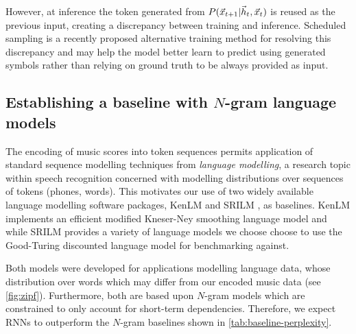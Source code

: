 However, at inference the token generated from $P(\vec{x}_{t+1} | \vec{h}_t, \vec{x}_t)$ is
reused as the previous input, creating a discrepancy between training and
inference. Scheduled sampling \citep{bengio2015scheduled} is a recently
proposed alternative training method for resolving this discrepancy and may
help the model better learn to predict using generated symbols rather than
relying on ground truth to be always provided as input.

\subsection{Establishing a baseline with $N$-gram language models}\label{sec:ngram-baselines}

The encoding of music scores into token sequences permits application of
standard sequence modelling techniques from \emph{language modelling}, a
research topic within speech recognition concerned with modelling distributions
over sequences of tokens (\eg phones, words). This motivates our use of two
widely available language modelling software packages, KenLM
\citep{Heafield-estimate} and SRILM \citep{stolcke2002srilm}, as baselines.
KenLM implements an efficient modified Kneser-Ney smoothing language model and
while SRILM provides a variety of language models we choose choose to use the
Good-Turing discounted language model for benchmarking against.

Both models were developed for applications modelling language data, whose distribution
over words which may differ from our encoded music data (see \vref{fig:zipf}).
Furthermore, both are based upon $N$-gram models which are constrained to only
account for short-term dependencies. Therefore, we expect RNNs to outperform the
$N$-gram baselines shown in \vref{tab:baseline-perplexity}.

